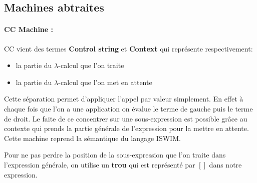 \documentclass[10pt,a4paper]{report}
\begin{document}
\subsection{Machines abtraites}

\paragraph{CC Machine :} CC vient des termes \textbf{Control string} et \textbf{Context} qui représente respectivement:
\begin{itemize}
\item la partie du $\lambda$-calcul que l'on traite
\item la partie du $\lambda$-calcul que l'on met en attente 
\end{itemize}
Cette séparation permet d'appliquer l'appel par valeur simplement. En effet à chaque fois que l'on a une application on évalue le terme de gauche puis le terme de droit. Le faite de ce concentrer sur une sous-expression est possible grâce au contexte qui prends la partie générale de l'expression pour la mettre en attente. Cette machine reprend la sémantique du langage ISWIM. 
\medbreak

Pour ne pas perdre la position de la sous-expression que l'on traite dans l'expression générale, on utilise un \textbf{trou} qui est représenté par $[]$ dans notre expression.
\bigbreak
\end{document}
